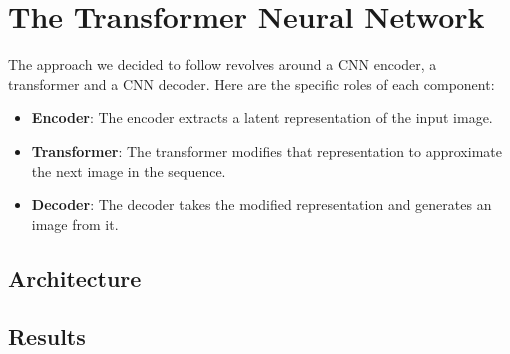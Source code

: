 \documentclass[lettersize,journal]{IEEEtran}
\begin{document}
\section{The Transformer Neural Network}
The approach we decided to follow revolves around a CNN encoder, a transformer and a CNN
decoder. Here are the specific roles of each component:
\begin{itemize}
    \item \textbf{Encoder}: The encoder extracts a latent representation of the input image.
    \item \textbf{Transformer}: The transformer modifies that representation to approximate 
    the next image in the sequence.
    \item \textbf{Decoder}: The decoder takes the modified representation and generates an
    image from it.
\end{itemize}

\subsection{Architecture}

\subsection{Results}

\vfill
\end{document}
